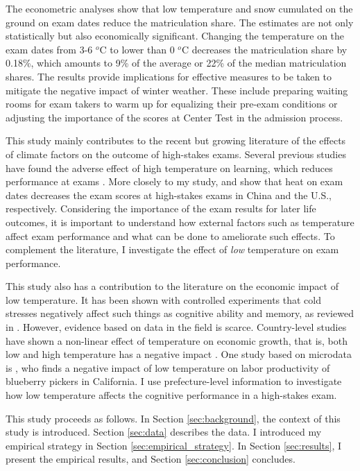 \documentclass[12pt,letterpaper]{article}
\begin{document}
The econometric analyses show that low temperature and snow cumulated on the ground on exam dates reduce the matriculation share.
The estimates are not only statistically but also economically significant.
Changing the temperature on the exam dates from 3-6 $^o$C to lower than 0 $^o$C decreases the matriculation share by 0.18\%, which amounts to 9\% of the average or 22\% of the median matriculation shares.
The results provide implications for effective measures to be taken to mitigate the negative impact of winter weather.
These include preparing waiting rooms for exam takers to warm up for equalizing their pre-exam conditions or adjusting the importance of the scores at Center Test in the admission process.

This study mainly contributes to the recent but growing literature of the effects of climate factors on the outcome of high-stakes exams.
Several previous studies have found the adverse effect of high temperature on learning, which reduces performance at exams \citep{Park2020b, Cho2017}.
More closely to my study, \citet{GraffZivin2020} and \citet{Park2020a} show that heat on exam dates decreases the exam scores at high-stakes exams in China and the U.S., respectively.
Considering the importance of the exam results for later life outcomes, it is important to understand how external factors such as temperature affect exam performance and what can be done to ameliorate such effects.
To complement the literature, I investigate the effect of \textit{low} temperature on exam performance.

This study also has a contribution to the literature on the economic impact of low temperature.
It has been shown with controlled experiments that cold stresses negatively affect such things as cognitive ability and memory, as reviewed in \citet{Taylor2016}.
However, evidence based on data in the field is scarce.
Country-level studies have shown a non-linear effect of temperature on economic growth, that is, both low and high temperature has a negative impact \citep{Burke2015}.
One study based on microdata is \citet{Stevens2017}, who finds a negative impact of low temperature on labor productivity of blueberry pickers in California.
I use prefecture-level information to investigate how low temperature affects the cognitive performance in a high-stakes exam.

This study proceeds as follows.
In Section \ref{sec:background}, the context of this study is introduced.
Section \ref{sec:data} describes the data. 
I introduced my empirical strategy in Section \ref{sec:empirical_strategy}.
In Section \ref{sec:results}, I present the empirical results, and Section \ref{sec:conclusion} concludes.
  
\end{document}
